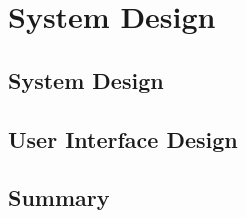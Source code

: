 \chapter[System Design]{System Design}

\section{System Design}

\section{User Interface Design}

\section{Summary}